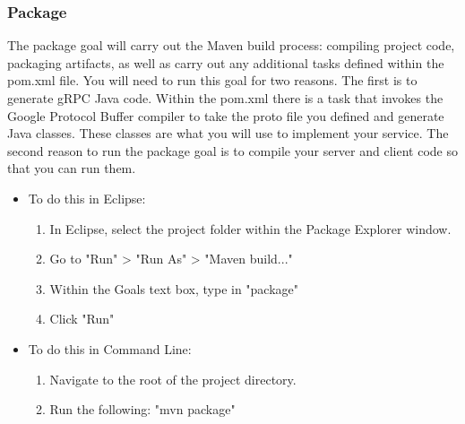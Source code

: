 \documentclass{article}
\begin{document}
\subsubsection*{Package}
The package goal will carry out the Maven build process: compiling project code, packaging artifacts, as well as carry out any additional tasks defined within the pom.xml file. You will need to run this goal for two reasons. The first is to generate gRPC Java code. Within the pom.xml there is a task that invokes the Google Protocol Buffer compiler to take the proto file you defined and generate Java classes. These classes are what you will use to implement your service. The second reason to run the package goal is to compile your server and client code so that you can run them.
\begin{itemize}
\item To do this in Eclipse:
	\begin{enumerate}
	\item In Eclipse, select the project folder within the Package Explorer window.
	\item Go to "Run" > "Run As" > "Maven build..."
	\item Within the Goals text box, type in "package"
	\item Click "Run" 
	\end{enumerate}
\item To do this in Command Line:
	\begin{enumerate}
	\item Navigate to the root of the project directory.
	\item Run the following: "mvn package"
	\end{enumerate}
\end{itemize}
\end{document}
